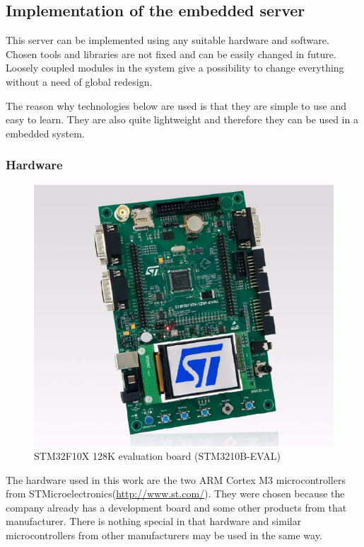 \newpage
\subsection{Implementation of the embedded server}
\label{sec:embedded_service_impl}
This server can be implemented using any suitable hardware and software.
Chosen tools and libraries are not fixed and can be easily changed in
future.
Loosely coupled modules in the system give a possibility to change everything
without a need of global redesign.

The reason why technologies below are used is that they are simple to use and
easy to learn. They are also quite lightweight and therefore they can be used in
a embedded system.

\subsubsection{Hardware}
\label{sec:hardware}
\begin{center}
 \begin{figure}[h]
	\includegraphics[height=0.5\textheight]{../images/implementation/embedded_server/stm3210b-eval.png}
	\caption{STM32F10X 128K evaluation board (STM3210B-EVAL)
	\cite{stm_eval_board_manual}}
	\label{fig:stm_eval_board}
 \end{figure}
\end{center}

The hardware used in this work are the two ARM Cortex M3 microcontrollers from
STMicroelectronics(\url{http://www.st.com/}). They were chosen because the
company already has a development board  and some other products from that
manufacturer. There is nothing special in that hardware and similar
microcontrollers from other manufacturers may be used in the same way.

